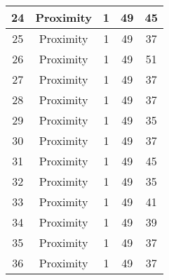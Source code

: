 \documentclass[results.tex]{subfiles}
\begin{document}
\begin{center}
\begin{tabular}{| c || c | c | c | c |}
            \hline
            24                      & Proximity                    & 1                      & 49                      & 45                   \\
            \hline
            25                      & Proximity                    & 1                      & 49                      & 37                   \\
            \hline
            26                      & Proximity                    & 1                      & 49                      & 51                   \\
            \hline
            27                      & Proximity                    & 1                      & 49                      & 37                   \\
            \hline
            28                      & Proximity                    & 1                      & 49                      & 37                   \\
            \hline
            29                      & Proximity                    & 1                      & 49                      & 35                   \\
            \hline
            30                      & Proximity                    & 1                      & 49                      & 37                   \\
            \hline
            31                      & Proximity                    & 1                      & 49                      & 45                   \\
            \hline
            32                      & Proximity                    & 1                      & 49                      & 35                   \\
            \hline
            33                      & Proximity                    & 1                      & 49                      & 41                   \\
            \hline
            34                      & Proximity                    & 1                      & 49                      & 39                   \\
            \hline
            35                      & Proximity                    & 1                      & 49                      & 37                   \\
            \hline
            36                      & Proximity                    & 1                      & 49                      & 37                   \\

\end{tabular}
\end{center}
\end{document}
